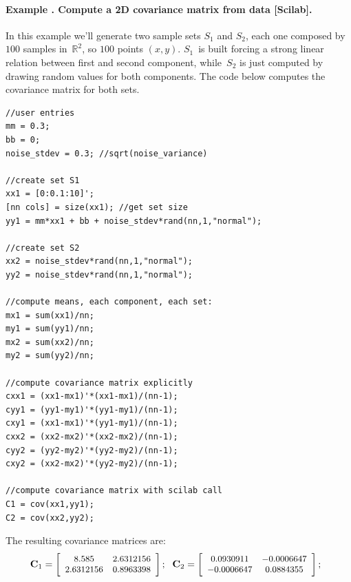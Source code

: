 \paragraph{Example \theexamplecounter. Compute a 2D covariance matrix from data [Scilab].}
In this example we'll generate two sample sets $S_1$ and $S_2$, each one composed by $100$ samples in~$\mathbb{R}^2$, so $100$ points $(x,y)$. $S_1$~is built forcing a strong linear relation between first and second component, while~$S_2$ is just computed by drawing random values for both components. The code below computes the covariance matrix for both sets.
\begin{mdframed}
\tiny
\begin{verbatim} 
//user entries
mm = 0.3;
bb = 0;
noise_stdev = 0.3; //sqrt(noise_variance)

//create set S1
xx1 = [0:0.1:10]';
[nn cols] = size(xx1); //get set size
yy1 = mm*xx1 + bb + noise_stdev*rand(nn,1,"normal");

//create set S2
xx2 = noise_stdev*rand(nn,1,"normal");
yy2 = noise_stdev*rand(nn,1,"normal");

//compute means, each component, each set:
mx1 = sum(xx1)/nn;
my1 = sum(yy1)/nn;
mx2 = sum(xx2)/nn;
my2 = sum(yy2)/nn;

//compute covariance matrix explicitly
cxx1 = (xx1-mx1)'*(xx1-mx1)/(nn-1);
cyy1 = (yy1-my1)'*(yy1-my1)/(nn-1);
cxy1 = (xx1-mx1)'*(yy1-my1)/(nn-1);
cxx2 = (xx2-mx2)'*(xx2-mx2)/(nn-1);
cyy2 = (yy2-my2)'*(yy2-my2)/(nn-1);
cxy2 = (xx2-mx2)'*(yy2-my2)/(nn-1);

//compute covariance matrix with scilab call
C1 = cov(xx1,yy1);
C2 = cov(xx2,yy2);
\end{verbatim} 
\end{mdframed}
The resulting covariance matrices are:
\begin{equation}
\small
\mathbf{C}_1 = 
\left[
 \begin{array}{cc}
    8.585      &  2.6312156  \\
    2.6312156  &  0.8963398  \\
 \end{array}
 \right];\ \ 
\mathbf{C}_2 = 
\left[
 \begin{array}{cc}
    0.0930911  & - 0.0006647  \\
  - 0.0006647  &  0.0884355   \\
 \end{array}
 \right];\ \ 
\end{equation}


